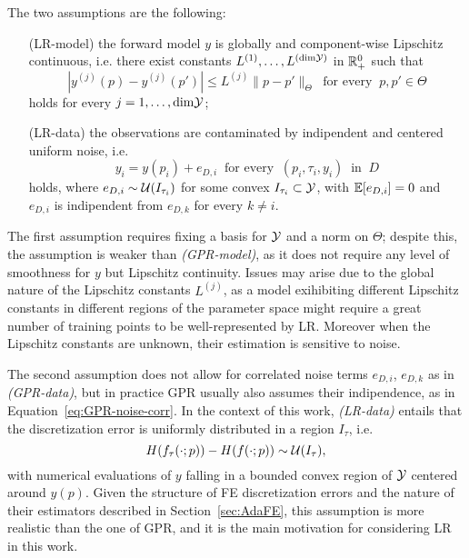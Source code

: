 The two assumptions are the following:
\begin{itemize}[font=\itshape, leftmargin=1.5cm, align=right, labelwidth=2.4cm]
    \item[(LR-model)] the forward model $y$ is globally and component-wise Lipschitz continuous, i.e. there exist constants $L^{(1)},\dots, L^{(\text{dim}\mathcal Y)}$ in $\mathbb{R}_+^0$ such that 
    \[
        |y^{(j)}(p) - y^{(j)}(p')| \leq L^{(j)} \|p - p'\|_\Theta \ \text{ for every } \ p, p' \in \Theta
    \]
    holds for every $j = 1, \dots, \text{dim}\mathcal Y$;
    \item[(LR-data)] the observations are contaminated by indipendent and centered uniform noise, i.e. 
    \[ 
        y_i = y(p_i) + e_{D,i} \ \text{ for every } \ (p_i,\tau_i,y_i) \ \text{ in } \ D
    \] 
    holds, where $e_{D,i} \sim \mathcal U(I_{\tau_i})$ for some convex $I_{\tau_i} \subset \mathcal Y$, with $\mathbb E[e_{D,i}] = 0$ and $e_{D,i}$ is indipendent from $e_{D,k}$ for every $k \neq i$.
\end{itemize}  
The first assumption requires fixing a basis for $\mathcal Y$ and a norm on $\Theta$; despite this, the assumption is weaker than \textit{(GPR-model)}, as it does not require any level of smoothness for $y$ but Lipschitz continuity. \newline
Issues may arise due to the global nature of the Lipschitz constants $L^{(j)}$, as a model exihibiting different Lipschitz constants in different regions of the parameter space might require a great number of training points to be well-represented by LR. 
Moreover when the Lipschitz constants are unknown, their estimation is sensitive to noise.

The second assumption does not allow for correlated noise terms $e_{D,i}$, $e_{D,k}$ as in \textit{(GPR-data)}, but in practice GPR usually also assumes their indipendence, as in Equation~\ref{eq:GPR-noise-corr}. 
In the context of this work, \textit{(LR-data)} entails that the discretization error is uniformly distributed in a region $I_\tau$, i.e. 
\[
    H(f_{\tau}(\cdot; p)) - H(f(\cdot; p)) \sim \mathcal U(I_\tau),
\] 
with numerical evaluations of $y$ falling in a bounded convex region of $\mathcal Y$ centered around $y(p)$. \newline
Given the structure of FE discretization errors and the nature of their estimators described in Section~\ref{sec:AdaFE}, this assumption is more realistic than the one of GPR, and it is the main motivation for considering LR in this work. \newline

